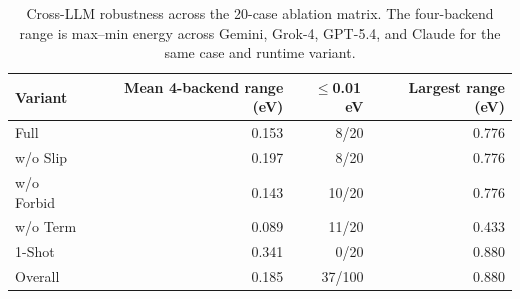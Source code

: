 \documentclass[%
 preprint,
 superscriptaddress,
 amsmath,amssymb,
 aps,
 prb,
 floatfix,
]{revtex4-2}
\begin{document}
\begin{table}[t]
\centering
\scriptsize
\caption{Cross-backend ablation summary on the completed 20-case CMU benchmark. Each row aggregates one variant across four LLM backends. $\Delta E = E_{\mathrm{variant}} - E_{\mathrm{full}}$; positive values indicate worse adsorption energy than the same-backend full AdsMind agent. For 1-Shot, energy statistics are conditional on successful non-dissociated runs; failed attempts are retained in the success-rate denominator.}
\label{tab:ablation-summary-main}
\end{table}






\begin{table}[t]
\centering
\caption{Cross-LLM robustness across the 20-case ablation matrix. The four-backend range is max--min energy across Gemini, Grok-4, GPT-5.4, and Claude for the same case and runtime variant.}
\label{tab:cross-llm-summary}
\begin{tabular}{lrrr}
\toprule
Variant & Mean 4-backend range (eV) & $\leq$0.01\,eV & Largest range (eV) \\
\midrule
Full      & 0.153 &  8/20 & 0.776 \\
w/o Slip  & 0.197 &  8/20 & 0.776 \\
w/o Forbid & 0.143 & 10/20 & 0.776 \\
w/o Term   & 0.089 & 11/20 & 0.433 \\
1-Shot    & 0.341 &  0/20 & 0.880 \\
\midrule
Overall              & 0.185 & 37/100 & 0.880 \\
\bottomrule
\end{tabular}
\end{table}
\end{document}
